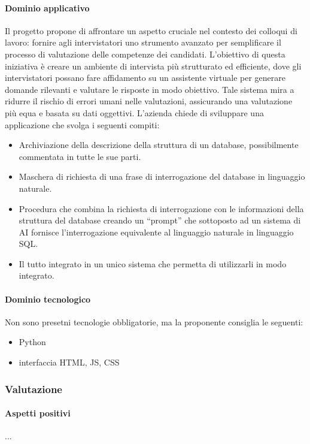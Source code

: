 \documentclass[italian,12pt]{article} %
\begin{document}
\paragraph{Dominio applicativo}
Il progetto propone di affrontare un aspetto cruciale nel contesto dei colloqui di lavoro: fornire agli intervistatori uno strumento avanzato per semplificare il processo di valutazione delle competenze dei candidati.
L'obiettivo di questa iniziativa è creare un ambiente di intervista più strutturato ed efficiente, dove gli intervistatori possano fare affidamento su un assistente virtuale per generare domande rilevanti e valutare le risposte in modo obiettivo. Tale sistema mira a ridurre il rischio di errori umani nelle valutazioni, assicurando una valutazione più equa e basata su dati oggettivi.
L'azienda chiede di sviluppare una applicazione che svolga i seguenti compiti:
\begin{itemize}
	\item Archiviazione della descrizione della struttura di un database, possibilmente commentata in tutte le sue parti.
	\item Maschera di richiesta di una frase di interrogazione del database in linguaggio naturale.
	\item Procedura che combina la richiesta di interrogazione con le informazioni della struttura del database creando un “prompt” che sottoposto ad un sistema di AI fornisce l’interrogazione equivalente al linguaggio naturale in linguaggio SQL.
	\item Il tutto integrato in un unico sistema che permetta di utilizzarli in modo integrato.
\end{itemize}
\paragraph{Dominio tecnologico}
Non sono presetni tecnologie obbligatorie, ma la proponente consiglia le seguenti:
\begin{itemize}
	\item Python
	\item interfaccia HTML, JS, CSS
\end{itemize}

\subsubsection{Valutazione}
\paragraph{Aspetti positivi}
...
\end{document}
